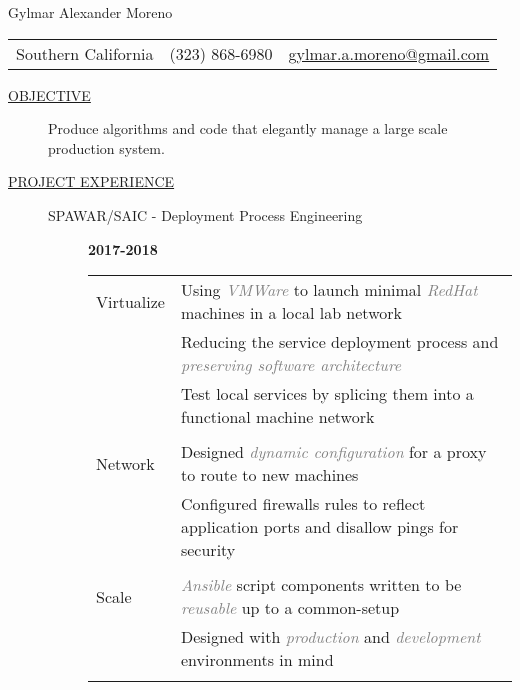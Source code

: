 \documentclass[12pt]{article}
\begin{document}
    \begin{center}
        {\LARGE Gylmar Alexander Moreno}
	\\
        \begin{tabular}{l|l|l}
            Southern California & (323) 868-6980 &
            \href{mailto:gylmar.a.moreno@gmail.com}{gylmar.a.moreno@gmail.com}
        \end{tabular}
    \end{center}

    \begin{description}
        \item[\underline{OBJECTIVE}] Produce algorithms and code that elegantly manage a large scale production system.
            \iffalse Produce algorithms and code that elegantly manage a large scale production system that\fi
        \item[\underline{PROJECT EXPERIENCE}] \hfill
            \begin{description}
                \item[SPAWAR/SAIC - Deployment Process Engineering] \hfill \textbf{2017-2018}\\
                    \begin{tabular}{l|l}
				    \\[-1.0mm]
\iffalse \textcolor{gray}{\textcolor{gray}{\textit{VMWare}}} \fi
			Virtualize & Using \textcolor{gray}{\textit{VMWare}} to launch minimal \textcolor{gray}{\textit{RedHat}} machines in a local lab network\\
				   & Reducing the service deployment process and \textcolor{gray}{\textit{preserving software architecture}}\\
				   & Test local services by splicing them into a functional machine network\\
				    \\[-1.7mm]
			Network	   & Designed \textcolor{gray}{\textit{dynamic configuration}} for a proxy to route to new machines\\
				   & Configured firewalls rules to reflect application ports and disallow pings for security\\
				    \\[-1.7mm]
			Scale	   & \textcolor{gray}{\textit{Ansible}} script components written to be \textcolor{gray}{\textit{reusable}} up to a common-setup\\
				   & Designed with \textcolor{gray}{\textit{production}} and \textcolor{gray}{\textit{development}} environments in mind\\
				    \\[-1.0mm]
                    \end{tabular}


\end{description}
\end{description}
\end{document}

